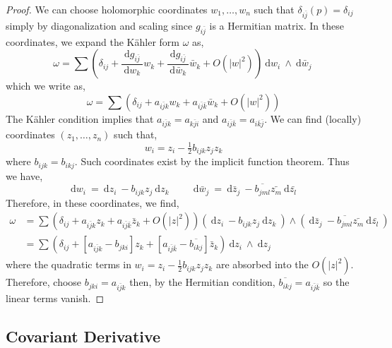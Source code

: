 \documentclass[12pt]{extarticle}
\renewcommand{\d}[1]{\: \mathrm{d}#1 \:}
\newcommand{\deriv}[2]{\frac{\d{#1}}{\d{#2}}}
\theoremstyle{definition}
\begin{document}
\begin{proof}
We can choose holomorphic coordinates $w_1, \dots, w_n$ such that $\delta_{i \bar{j}}(p) = \delta_{ij}$ simply by diagonalization and scaling since $g_{i \bar{j}}$ is a Hermitian matrix. In these coordinates, we expand the K\"{a}hler form $\omega$ as,
\[ \omega = \sum \left( \delta_{ij} + \deriv{g_{i \bar{j}}}{w_k} w_k + \deriv{g_{i \bar{j}}}{\bar{w}_k} \bar{w}_k + O(|w|^2) \right) \d{w_i} \wedge \d{\bar{w}_j}  \] 
which we write as,
\[ \omega = \sum \left( \delta_{ij} + a_{i \bar{j} k} w_k + a_{i \bar{j} \bar{k}} \bar{w}_k + O(|w|^2) \right) \]
The K\"{a}hler condition implies that $a_{i \bar{j} k} = a_{k \bar{j} i}$ and $a_{i \bar{j} \bar{k}} = a_{i\bar{k} \bar{j}}$. We can find (locally) coordinates $(z_1, \dots, z_n)$ such that,
\[ w_i = z_i - \tfrac{1}{2} b_{ijk} z_j z_k \]
where $b_{ijk} = b_{ikj}$. Such coordinates exist by the implicit function theorem. Thus we have,
\[ \d{w_i} = \d{z_i} - b_{ijk} z_j \d{z_k} \quad \quad \d{\bar{w}_j} = \d{\bar{z}_j} - \overline{b_{jml}} \bar{z_m} \d{\bar{z_l}} \]
Therefore, in these coordinates, we find,
\begin{align*}
\omega & = \sum \left( \delta_{ij} + a_{i \bar{j} k} z_k + a_{i \bar{j} \bar{k}} \bar{z}_k + O(|z|^2) \right) \left( \d{z_i} - b_{ijk} z_j \d{z_k} \right) \wedge \left( \d{\bar{z}_j} - \overline{b_{jml}} \bar{z_m} \d{\bar{z_l}} \right)
\\
& = \sum \left( \delta_{ij} + [ a_{i \bar{j} k} - b_{jki} ] z_k + [a_{i \bar{j} \bar{k}} - \overline{b_{ikj}}] \bar{z}_k \right) \d{z_i} \wedge \d{z_j} 
\end{align*}
where the quadratic terms in $w_i = z_i - \tfrac{1}{2} b_{ijk} z_j z_k$ are absorbed into the $O(|z|^2)$. Therefore, choose $b_{jki} = a_{i \bar{j} k}$ then, by the Hermitian condition, $\overline{b_{ikj}} = a_{i \bar{j} \bar{k}}$ so the linear terms vanish.  
\end{proof}

\subsection{Covariant Derivative}
\end{document}
